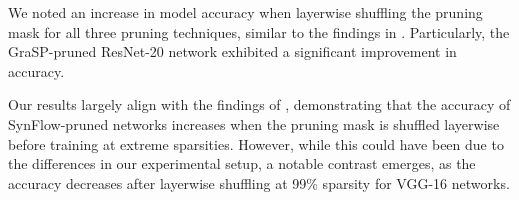 We noted an increase in model accuracy when layerwise shuffling the pruning mask for all three pruning techniques, similar to the findings in \textcite{frankle21}. Particularly, the GraSP-pruned ResNet-20 network exhibited a significant improvement in accuracy. 

Our results largely align with the findings of \textcite{frankle21}, demonstrating that the accuracy of SynFlow-pruned networks increases when the pruning mask is shuffled layerwise before training at extreme sparsities. However, while this could have been due to the differences in our experimental setup, a notable contrast emerges, as the accuracy decreases after layerwise shuffling at 99\% sparsity for VGG-16 networks.